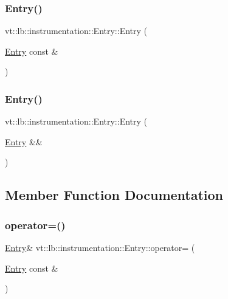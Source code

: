 \subsubsection{\texorpdfstring{Entry()}{Entry()}\hspace{0.1cm}{\footnotesize\ttfamily [3/4]}}
{\footnotesize\ttfamily vt\+::lb\+::instrumentation\+::\+Entry\+::\+Entry (\begin{DoxyParamCaption}\item[{\hyperlink{structvt_1_1lb_1_1instrumentation_1_1_entry}{Entry} const \&}]{ }\end{DoxyParamCaption})\hspace{0.3cm}{\ttfamily [default]}}

\mbox{\label{structvt_1_1lb_1_1instrumentation_1_1_entry_a659525a81bbcf2b9269e53628216733f}} 
\subsubsection{\texorpdfstring{Entry()}{Entry()}\hspace{0.1cm}{\footnotesize\ttfamily [4/4]}}
{\footnotesize\ttfamily vt\+::lb\+::instrumentation\+::\+Entry\+::\+Entry (\begin{DoxyParamCaption}\item[{\hyperlink{structvt_1_1lb_1_1instrumentation_1_1_entry}{Entry} \&\&}]{ }\end{DoxyParamCaption})\hspace{0.3cm}{\ttfamily [default]}}



\subsection{Member Function Documentation}
\mbox{\label{structvt_1_1lb_1_1instrumentation_1_1_entry_ad67e675730870f91a9e1c975637e81bc}} 
\subsubsection{\texorpdfstring{operator=()}{operator=()}}
{\footnotesize\ttfamily \hyperlink{structvt_1_1lb_1_1instrumentation_1_1_entry}{Entry}\& vt\+::lb\+::instrumentation\+::\+Entry\+::operator= (\begin{DoxyParamCaption}\item[{\hyperlink{structvt_1_1lb_1_1instrumentation_1_1_entry}{Entry} const \&}]{ }\end{DoxyParamCaption})\hspace{0.3cm}{\ttfamily [default]}}

